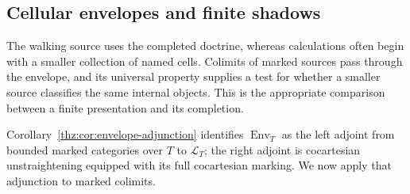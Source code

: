 \documentclass[oneside]{article}
\theoremstyle{plain}
\theoremstyle{definition}
\theoremstyle{remark}
\newcommand{\Env}{\operatorname{Env}}
\begin{document}
\subsection{Cellular envelopes and finite shadows}\label{sec:thz:cellular}

The walking source uses the completed doctrine, whereas calculations
often begin with a smaller collection of named cells. Colimits of marked
sources pass through the envelope, and its universal property supplies a
test for whether a smaller source classifies the same internal objects.
This is the appropriate comparison between a finite presentation and its
completion.

Corollary~\ref{thz:cor:envelope-adjunction} identifies $\Env_T$ as the
left adjoint from bounded marked categories over $T$ to $\mathcal L_T$;
the right adjoint is cocartesian unstraightening equipped with its full
cocartesian marking.  We now apply that adjunction to marked colimits.
\end{document}
